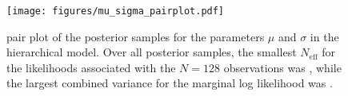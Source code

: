 \documentclass[modern]{aastex631}
\newcommand{\Neff}{N_{\mathrm{eff}}}
\begin{document}
\begin{figure}
    \texttt{[image: figures/mu\_sigma\_pairplot.pdf]}
    \caption{\label{fig:mu-sigma} pair plot of the posterior samples for the
    parameters $\mu$ and $\sigma$ in the hierarchical model.  Over all posterior
    samples, the smallest $\Neff$ for the likelihoods associated with the
    $N=128$ observations was , while the largest
    combined variance for the marginal log likelihood was
    .}
\end{figure}


\end{document}
